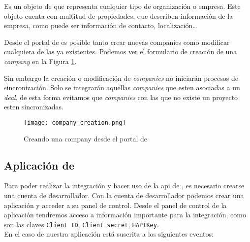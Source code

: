 		Es un objeto de \hs{} que representa cualquier tipo de organización o empresa. 
		Este objeto cuenta con multitud de propiedades, que describen información de la empresa, como puede ser información de contacto, localización\ldots 
		
		Desde el portal de \hs{} es posible tanto crear nuevas companies como modificar cualquiera de las ya existentes. Podemos ver el formulario de creación de una \textit{company} en la Figura \ref{fig:company_creation}.
		
		Sin embargo la creación o modificación de \textit{companies} no iniciarán procesos de sincronización. Solo se integrarán aquellas \textit{companies} que esten asociadas a un \textit{deal}.
		de esta forma evitamos que \textit{companies} con las que no existe un proyecto esten sincronizadas.
		
		\begin{figure}
			\centering
			\texttt{[image: company\_creation.png]}
			\caption{Creando una company desde el portal de \hs{}}
			\label{fig:company_creation}
		\end{figure}


\subsection{Aplicación de \hs{}}
\label{subsec:app_hs}
Para poder realizar la integración y hacer uso de la \acrshort{api} de \hs{} \cite{hsapi}, es necesario crearse una cuenta de desarrollador. Con la cuenta de desarrollador podemos crear una aplicación y acceder a su panel de control. 
Desde el panel de control de la aplicación tendremos acceso a información importante para la integración, como son las claves \texttt{Client ID}, \texttt{Client secret}, \texttt{HAPIKey}.\\



En el caso de nuestra aplicación está suscrita a los siguientes eventos:

